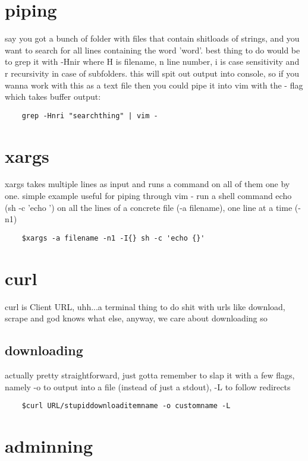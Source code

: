 \section{piping}
\label{sec:piping}

say you got a bunch of  folder with files that contain shitloads of strings, and you want to search for all lines containing the word 'word'. best thing to do would be to grep it with -Hnir where H is filename, n line number, i is case sensitivity and r recursivity in case of subfolders. this will spit out output into console, so if you wanna work with this as a text file then you could pipe it into vim with the - flag which takes buffer output:
\begin{verbatim}
	grep -Hnri "searchthing" | vim -
\end{verbatim}

\section{xargs}%
\label{sec:xargs}

xargs takes multiple lines as input and runs a command on all of them one by one. simple example useful for piping through vim - run a shell command echo (sh -c 'echo {}') on all the lines of a concrete file (-a filename), one line at a time (-n1)
\begin{verbatim}
	$xargs -a filename -n1 -I{} sh -c 'echo {}'
\end{verbatim}
\section{curl}%
\label{sec:curl}

curl is Client URL, uhh...a terminal thing to do shit with urls like download, scrape and god knows what else, anyway, we care about downloading so
\subsection{downloading}%
\label{sub:downloading}

actually pretty straightforward, just gotta remember to slap it with a few flags, namely -o to output into a file (instead of just a stdout), -L to follow redirects
\begin{verbatim}
	$curl URL/stupiddownloaditemname -o customname -L
\end{verbatim}
\section{adminning}%
\label{sec:adminning}

